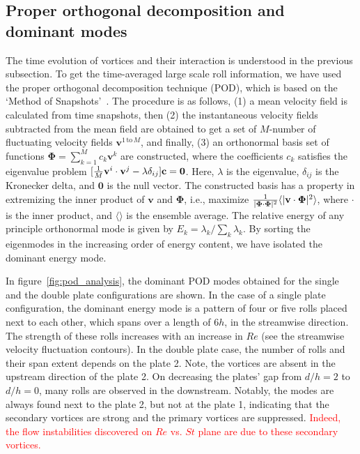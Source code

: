 \documentclass[aps,pre,twocolumn,aps,longbibliography]{revtex4-1}
\begin{document}
	
	\subsection{Proper orthogonal decomposition and dominant modes}
	
	
	The time evolution of vortices and their interaction is understood in the previous subsection. To get the time-averaged large scale roll information, we have used the proper orthogonal decomposition technique (POD), which is based on the `Method of Snapshots'~\cite{Holmes2012}. The procedure is as follows, (1) a mean velocity field is calculated from time snapshots, then (2) the instantaneous velocity fields subtracted from the mean field are obtained to get a set of $M$-number of fluctuating velocity fields $\mathbf{v}^{1\, \text{to}\, M}$, and finally, (3) an orthonormal basis set of functions $\mathbf{\Phi}=\sum_{k=1}^{M} c_k\mathbf{v}^k$ are constructed, where the coefficients $c_k$ satisfies the eigenvalue problem 
	$[{1\over M}\mathbf{v}^i\cdot\mathbf{v}^j-\lambda \delta_{ij}]\mathbf{c}=\mathbf{0}$. Here, $\lambda$ is the eigenvalue, $\delta_{ij}$ is the Kronecker delta, and $\mathbf{0}$ is the null vector. The constructed basis has a property in extremizing the inner product of $\mathbf{v}$ and $\mathbf{\Phi}$, i.e., maximize ${1\over{|\mathbf{\Phi}\cdot\mathbf{\Phi}|^2}}\langle{|\mathbf{v}\cdot\mathbf{\Phi}|^2}\rangle$, where $\cdot$ is the inner product, and $\langle\rangle$ is the ensemble average. The relative energy of any principle orthonormal mode is given by $E_k=\lambda_k/{\sum_k \lambda_k}$. By sorting the eigenmodes in the increasing order of energy content, we have isolated the dominant energy mode. 
	
	
	In figure~\ref{fig:pod_analysis}, the dominant POD modes obtained for the single and the double plate configurations are shown. In the case of a single plate configuration, the dominant energy mode is a pattern of four or five rolls placed next to each other, which spans over a length of $6h$, in the streamwise direction. The strength of these rolls increases with an increase in $Re$ (see the streamwise velocity fluctuation contours). In the double plate case, the number of rolls and their span extent depends on the plate 2. Note, the vortices are absent in the upstream direction of the plate 2. On decreasing the plates' gap from $d/h=2$ to $d/h=0$, many rolls are observed in the downstream. Notably, the modes are always found next to the plate 2, but not at the plate 1, indicating that the secondary vortices are strong and the primary vortices are suppressed. \textcolor{red}{Indeed, the flow instabilities discovered on $Re$ vs. $St$ plane are due to these secondary vortices.}
	
\end{document}
